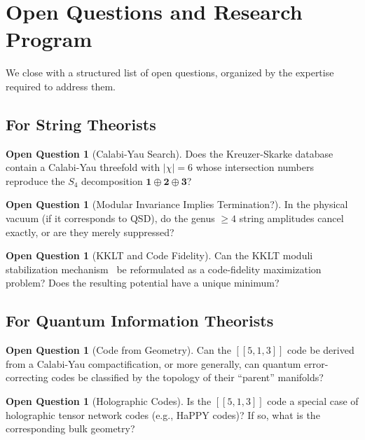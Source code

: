 \documentclass[11pt,a4paper]{article}
\theoremstyle{definition}
\newtheorem{question}[theorem]{Open Question}
\begin{document}
\section{Open Questions and Research Program}
\label{sec:questions}

We close with a structured list of open questions, organized by the
expertise required to address them.

\subsection{For String Theorists}

\begin{question}[Calabi-Yau Search]
Does the Kreuzer-Skarke database~\cite{KreuzerSkarke2000} contain a Calabi-Yau threefold with
$|\chi| = 6$ whose intersection numbers reproduce the $S_4$ decomposition
$\mathbf{1}\oplus\mathbf{2}\oplus\mathbf{3}$?
\end{question}

\begin{question}[Modular Invariance Implies Termination?]
In the physical vacuum (if it corresponds to QSD), do the genus $\geq 4$
string amplitudes cancel exactly, or are they merely suppressed?
\end{question}

\begin{question}[KKLT and Code Fidelity]
Can the KKLT moduli stabilization mechanism~\cite{KKLT2003} be reformulated as a
code-fidelity maximization problem?  Does the resulting potential have a
unique minimum?
\end{question}

\subsection{For Quantum Information Theorists}

\begin{question}[Code from Geometry]
Can the $[[5,1,3]]$ code be derived from a Calabi-Yau compactification, or
more generally, can quantum error-correcting codes be classified by the
topology of their ``parent'' manifolds?
\end{question}

\begin{question}[Holographic Codes]
Is the $[[5,1,3]]$ code a special case of holographic tensor network codes
(e.g., HaPPY codes)?  If so, what is the corresponding bulk geometry?
\end{question}
\end{document}
